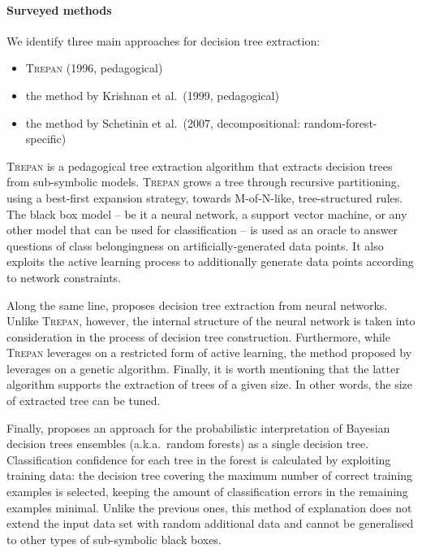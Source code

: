 \documentclass[12pt,a4paper,openright,twoside]{book}
\begin{document}
\paragraph{Surveyed methods}

We identify three main approaches for decision tree extraction:
%
\begin{itemize}
	\item \textsc{Trepan} (1996, pedagogical) \cite{CravenS95}
	\item the method by Krishnan et al.\ (1999, pedagogical) \cite{KrishnanSB1999}
	\item the method by Schetinin et al.\ (2007, decompositional: random-forest-specific) \cite{schetinin2007}
\end{itemize}

\textsc{Trepan} \cite{CravenS95} is a pedagogical tree extraction algorithm that extracts decision trees from sub-symbolic models.
%
\textsc{Trepan} grows a tree through recursive partitioning, using a best-first expansion strategy, towards M-of-N-like, tree-structured rules.
%
The black box model -- be it a neural network, a support vector machine, or any other model that can be used for classification -- is used as an oracle to answer questions of class belongingness on artificially-generated data points.
%
It also exploits the active learning process to additionally generate data points according to network constraints.

Along the same line, \cite{KrishnanSB1999} proposes decision tree extraction from neural networks.
%
Unlike \textsc{Trepan}, however, the internal structure of the neural network is taken into consideration in the process of decision tree construction.
%
Furthermore, while \textsc{Trepan} leverages on a restricted form of active learning, the method proposed by \cite{KrishnanSB1999} leverages on a genetic algorithm.
%
Finally, it is worth mentioning that the latter algorithm supports the extraction of trees of a given size.
%
In other words, the size of extracted tree can be tuned.

Finally, \cite{schetinin2007} proposes an approach for the probabilistic interpretation of Bayesian decision trees ensembles (a.k.a.\ random forests) as a single decision tree.
%
Classification confidence for each tree in the forest is calculated by exploiting training data: the decision tree covering the maximum number of correct training examples is selected, keeping the amount of classification errors in the remaining examples minimal.
%
Unlike the previous ones, this method of explanation does not extend the input data set with random additional data and cannot be generalised to other types of sub-symbolic black boxes.
\end{document}
